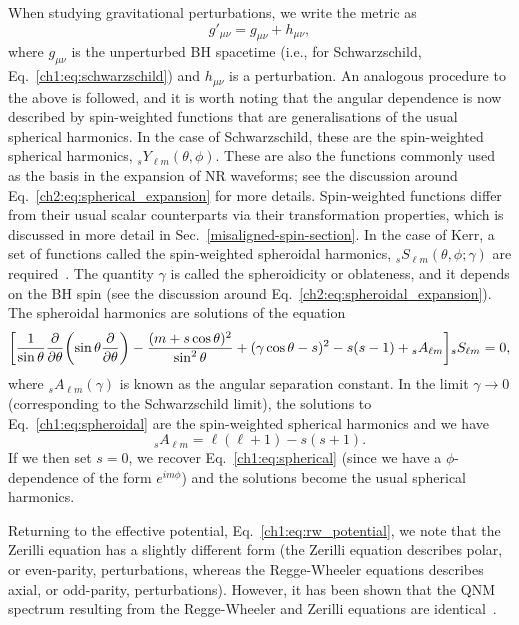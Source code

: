 When studying gravitational perturbations, we write the metric as
\begin{equation}
    g'_{\mu\nu} = g_{\mu\nu} + h_{\mu\nu},
\end{equation}
where $g_{\mu\nu}$ is the unperturbed BH spacetime (i.e., for Schwarzschild, Eq.~\ref{ch1:eq:schwarzschild}) and $h_{\mu\nu}$ is a perturbation. 
An analogous procedure to the above is followed, and it is worth noting that the angular dependence is now described by spin-weighted functions that are generalisations of the usual spherical harmonics.
In the case of Schwarzschild, these are the spin-weighted spherical harmonics, ${}_sY_{\ell m}(\theta,\phi)$.
These are also the functions commonly used as the basis in the expansion of NR waveforms; see the discussion around Eq.~\ref{ch2:eq:spherical_expansion} for more details.
Spin-weighted functions differ from their usual scalar counterparts via their transformation properties, which is discussed in more detail in Sec.~\ref{misaligned-spin-section}.
In the case of Kerr, a set of functions called the spin-weighted spheroidal harmonics, ${}_{s}S_{\ell m}(\theta, \phi; \gamma)$ are required~\cite{Teukolsky:1973ha}.
The quantity $\gamma$ is called the spheroidicity or oblateness, and it depends on the BH spin (see the discussion around Eq.~\ref{ch2:eq:spheroidal_expansion}).
The spheroidal harmonics are solutions of the equation
\begin{equation}\label{ch1:eq:spheroidal}
    \qty[\frac{1}{\sin{\theta}} \pdv{\theta} \qty(\sin{\theta} \pdv{\theta} ) - \frac{(m + s\cos{\theta})^2}{\sin^2{\theta}} + (\gamma\cos{\theta} - s)^2 - s(s-1) + {}_sA_{\ell m}] {}_{s}S_{\ell m}  = 0,
\end{equation}
where ${}_sA_{\ell m}(\gamma)$ is known as the angular separation constant.
In the limit $\gamma \rightarrow 0$ (corresponding to the Schwarzschild limit), the solutions to Eq.~\ref{ch1:eq:spheroidal} are the spin-weighted spherical harmonics and we have
\begin{equation}
    {}_sA_{\ell m} = \ell(\ell + 1) - s(s + 1).
\end{equation}
If we then set $s = 0$, we recover Eq.~\ref{ch1:eq:spherical} (since we have a $\phi$-dependence of the form $e^{im\phi}$) and the solutions become the usual spherical harmonics.

Returning to the effective potential, Eq.~\ref{ch1:eq:rw_potential}, we note that the Zerilli equation has a slightly different form (the Zerilli equation describes polar, or even-parity, perturbations, whereas the Regge-Wheeler equations describes axial, or odd-parity, perturbations). 
However, it has been shown that the QNM spectrum resulting from the Regge-Wheeler and Zerilli equations are identical~\cite{Chandrasekhar:1975nkd}.

